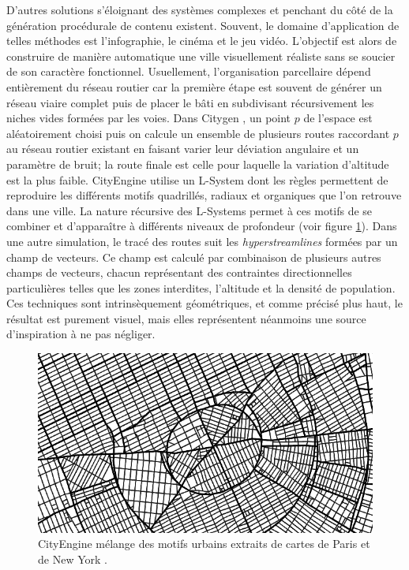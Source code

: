 \documentclass[12pt]{article}
\begin{document}
D'autres solutions s'éloignant des systèmes complexes et penchant du
côté de la génération procédurale de contenu existent. Souvent, le
domaine d'application de telles méthodes est l'infographie, le cinéma
et le jeu vidéo. L'objectif est alors de construire de manière
automatique une ville visuellement réaliste sans se soucier de son
caractère fonctionnel. Usuellement, l'organisation parcellaire dépend
entièrement du réseau routier car la première étape est souvent de
générer un réseau viaire complet puis de placer le bâti en subdivisant
récursivement les niches vides formées par les voies. Dans Citygen
\cite{Kelly2006b}, un point $p$ de l'espace est aléatoirement choisi
puis on calcule un ensemble de plusieurs routes raccordant $p$ au
réseau routier existant en faisant varier leur déviation angulaire et
un paramètre de bruit; la route finale est celle pour laquelle la
variation d'altitude est la plus faible. CityEngine \cite{Parish2001}
utilise un L-System dont les règles permettent de reproduire les
différents motifs quadrillés, radiaux et organiques que l'on retrouve
dans une ville. La nature récursive des L-Systems permet à ces motifs
de se combiner et d'apparaître à différents niveaux de profondeur
(voir figure \ref{fig:cityengine}). Dans une autre simulation, le
tracé des routes suit les \textit{hyperstreamlines} \cite{Chen2008}
formées par un champ de vecteurs. Ce champ est calculé par combinaison
de plusieurs autres champs de vecteurs, chacun représentant des
contraintes directionnelles particulières telles que les zones
interdites, l'altitude et la densité de population. Ces techniques
sont intrinsèquement géométriques, et comme précisé plus haut, le
résultat est purement visuel, mais elles représentent néanmoins une
source d'inspiration à ne pas négliger.

\begin{figure}[H]
  \centering
  \includegraphics[width=.8\linewidth]{images/cityengine.png}
  \caption{CityEngine mélange des motifs urbains extraits de cartes de
    Paris et de New York \cite{Parish2001}.}
  \label{fig:cityengine}
\end{figure}
\end{document}
